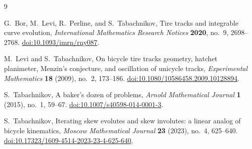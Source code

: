\documentclass[11pt]{article}
\numberwithin{equation}{section}
\begin{document}
\begin{thebibliography}{9}
\raggedright

G.~Bor, M.~Levi, R.~Perline, and S.~Tabachnikov,
\newblock Tire tracks and integrable curve evolution,
\newblock \emph{International Mathematics Research Notices}
\textbf{2020}, no.~9, 2698--2768.
\newblock \href{https://doi.org/10.1093/imrn/rny087}{doi:10.1093/imrn/rny087}.

M.~Levi and S.~Tabachnikov,
\newblock On bicycle tire tracks geometry, hatchet planimeter, Menzin's
conjecture, and oscillation of unicycle tracks,
\newblock \emph{Experimental Mathematics} \textbf{18} (2009), no.~2,
173--186.
\newblock \href{https://doi.org/10.1080/10586458.2009.10128894}
{doi:10.1080/10586458.2009.10128894}.

S.~Tabachnikov,
\newblock A baker's dozen of problems,
\newblock \emph{Arnold Mathematical Journal} \textbf{1} (2015), no.~1,
59--67.
\newblock \href{https://doi.org/10.1007/s40598-014-0001-3}
{doi:10.1007/s40598-014-0001-3}.

S.~Tabachnikov,
\newblock Iterating skew evolutes and skew involutes: a linear analog of
bicycle kinematics,
\newblock \emph{Moscow Mathematical Journal} \textbf{23} (2023), no.~4,
625--640.
\newblock \href{https://doi.org/10.17323/1609-4514-2023-23-4-625-640}
{\mbox{doi:10.17323/1609-4514-2023-23-4-625-640}}.

\end{thebibliography}
\end{document}
